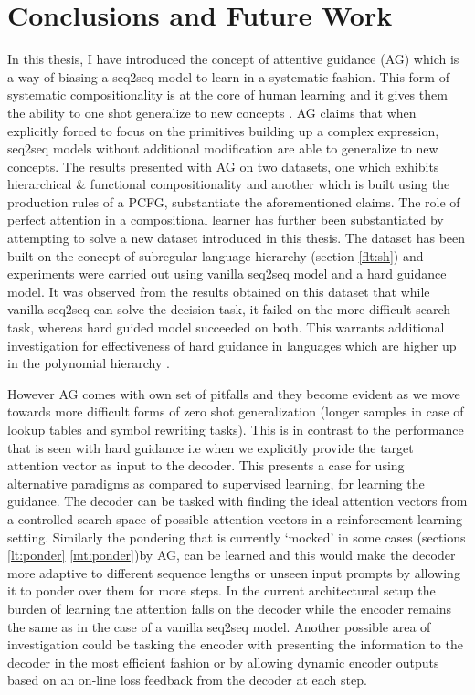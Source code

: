 \chapter{Conclusions and Future Work} \label{Chapter:conclusion}%
In this thesis, I have introduced the concept of attentive guidance (AG) which is a way of biasing a seq2seq model to learn in a systematic fashion. This form of systematic compositionality is at the core of human learning \citep{marcus2003algebraic} and it gives them the ability to one shot generalize to new concepts \citep{Lake2016}. AG claims that when explicitly forced to focus on the primitives building up a complex expression, seq2seq models without additional modification are able to generalize to new concepts. The results presented with AG on two datasets, one which exhibits hierarchical \& functional compositionality and another which is built using the production rules of a PCFG, substantiate the aforementioned claims. The role of perfect attention in a compositional learner has further been substantiated by attempting to solve a new dataset introduced in this thesis. The dataset has been built on the concept of subregular language hierarchy (section \ref{flt:sh}) and experiments were carried out using vanilla seq2seq model and a hard guidance model. It was observed from the results obtained on this dataset that while vanilla seq2seq can solve the decision task, it failed on the more difficult search task, whereas hard guided model succeeded on both. This warrants additional investigation for effectiveness of hard guidance in languages which are higher up in the polynomial hierarchy \citep{arora2009computational}. 

However AG comes with own set of pitfalls and they become evident as we move towards more difficult forms of zero shot generalization (longer samples in case of lookup tables and symbol rewriting tasks). This is in contrast to the performance that is seen with hard guidance i.e when we explicitly provide the target attention vector as input to the decoder. This presents a case for using alternative paradigms as compared to supervised learning, for learning the guidance. The decoder can be tasked with finding the ideal attention vectors from a controlled search space of possible attention vectors in a reinforcement learning \citep{sutton2018reinforcement} setting. Similarly the pondering that is currently \lq mocked\rq{} in some cases (sections \ref{lt:ponder} \ref{mt:ponder})by AG, can be learned and this would make the decoder more adaptive to different sequence lengths or unseen input prompts by allowing it to ponder over them for more steps. In the current architectural setup the burden of learning the attention falls on the decoder while the encoder remains the same as in the case of a vanilla seq2seq model. Another possible area of investigation could be tasking the encoder with presenting the information to the decoder in the most efficient fashion or by allowing dynamic encoder outputs based on an on-line loss feedback from the decoder at each step. 

